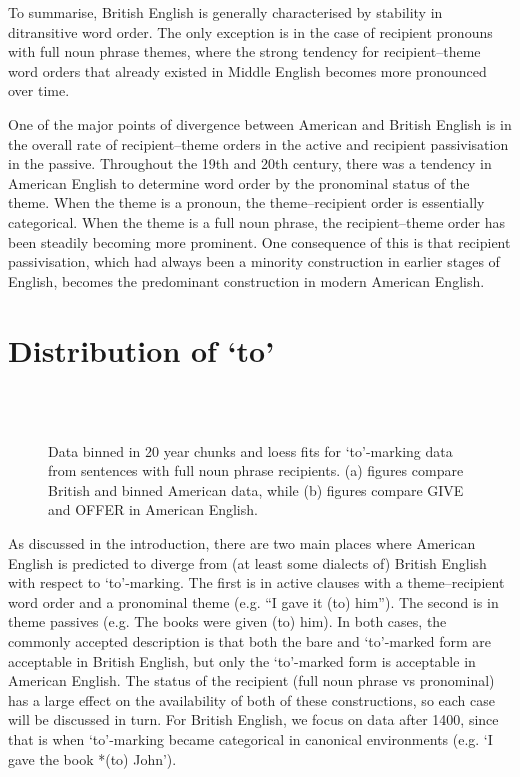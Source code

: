 To summarise, British English is generally characterised by stability in ditransitive word order. The only exception is in the case of recipient pronouns with full noun phrase themes, where the strong tendency for recipient--theme word orders that already existed in Middle English becomes more pronounced over time.

One of the major points of divergence between American and British English is in the overall rate of recipient--theme orders in the active and recipient passivisation in the passive. Throughout the 19th and 20th century, there was a tendency in American English to determine word order by the pronominal status of the theme. When the theme is a pronoun, the theme--recipient order is essentially categorical. When the theme is a full noun phrase, the recipient--theme order has been steadily becoming more prominent. One consequence of this is that recipient passivisation, which had always been a minority construction in earlier stages of English, becomes the predominant construction in modern American English.

\section{Distribution of `to'}
\begin{figure}[p]
\\
\\
\label{Fig:tonouns}
\caption{Data binned in 20 year chunks and loess fits for `to'-marking data from sentences with full noun phrase recipients. (a) figures compare British and binned American data, while (b) figures compare GIVE and OFFER in American English.}
\end{figure}
As discussed in the introduction, there are two main places where American English is predicted to diverge from (at least some dialects of) British English with respect to `to'-marking. The first is in active clauses with a theme--recipient word order and a pronominal theme (e.g. ``I gave it (to) him''). The second is in theme passives (e.g. The books were given (to) him). In both cases, the commonly accepted description is that both the bare and `to'-marked form are acceptable in British English, but only the `to'-marked form is acceptable in American English. The status of the recipient (full noun phrase vs pronominal) has a large effect on the availability of both of these constructions, so each case will be discussed in turn. For British English, we focus on data after 1400, since that is when `to'-marking became categorical in canonical environments (e.g. `I gave the book *(to) John').

